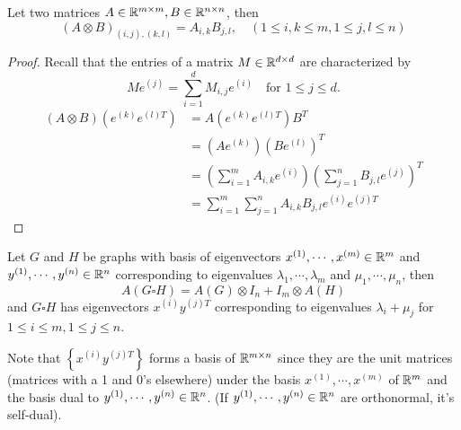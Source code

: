\begin{lemma}
Let two matrices \(A\in\mathbb{R}^{m\times m},B\in\mathbb{R}^{n\times n}\), then
\[ (A\otimes B)_{(i,j),(k,l)}=A_{i,k}B_{j,l}, \quad (1\leq i,k\leq m,1\leq j,l\leq n) \]
\end{lemma}
\begin{proof}
Recall that the entries of a matrix \(M\in\mathbb{R}^{d\times d}\) are characterized by
\[ Me^{(j)}=\sum_{i=1}^{d}M_{i,j}e^{(i)} \quad \text{for } 1\leq j\leq d. \]
\begin{align*}
(A\otimes B)\left(e^{(k)}e^{(l)T}\right)&=A\left(e^{(k)}e^{(l)T}\right)B^T\\
&=\left(Ae^{(k)}\right)\left(Be^{(l)}\right)^T\\
&=\left(\sum_{i=1}^m A_{i,k}e^{(i)}\right)\left(\sum_{j=1}^n B_{j,l}e^{(j)}\right)^T\\
&=\sum_{i=1}^m \sum_{j=1}^n A_{i,k}B_{j,l} e^{(i)}e^{(j)T}
\end{align*}
\end{proof}

\begin{corollary}
Let \(G\) and \(H\) be graphs with basis of eigenvectors \(x^{(1)},\cdots,x^{(m)}\in\mathbb{R}^m\) and \(y^{(1)},\cdots,y^{(n)}\in\mathbb{R}^n\) corresponding to eigenvalues \(\lambda_1,\cdots,\lambda_m\) and \(\mu_1,\cdots,\mu_n\), then
\[ A(G\square H)=A(G)\otimes I_n + I_m\otimes A(H) \]
and \(G\square H\) has eigenvectors \(x^{(i)}y^{(j)T}\) corresponding to eigenvalues \(\lambda_i+\mu_j\) for \(1\leq i \leq m,1\leq j\leq n\).
\end{corollary}
\begin{remark}
Note that \(\left\{x^{(i)}y^{(j)T}\right\}\) forms a basis of \(\mathbb{R}^{m\times n}\) since they are the unit matrices (matrices with a 1 and 0's elsewhere) under the basis \(x^{(1)},\cdots,x^{(m)}\) of \(\mathbb{R}^m\) and the basis dual to \(y^{(1)},\cdots,y^{(n)}\in\mathbb{R}^n\).
(If \(y^{(1)},\cdots,y^{(n)}\in\mathbb{R}^n\) are orthonormal, it's self-dual).
\end{remark}
